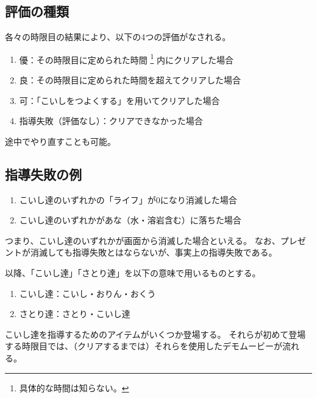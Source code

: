 \subsection{評価の種類}
各々の時限目の結果により、以下の4つの評価がなされる。
\begin{enumerate}[label={\sarrow}]
\item 優：その時限目に定められた時間%
\footnote{具体的な時間は知らない。}%
内にクリアした場合
\item 良：その時限目に定められた時間を超えてクリアした場合
\item 可：「こいしをつよくする」を用いてクリアした場合
\item 指導失敗（評価なし）：クリアできなかった場合
\end{enumerate}
途中でやり直すことも可能。


\subsection{指導失敗の例}
\begin{enumerate}[label={\sarrow}]
\item こいし達のいずれかの「ライフ」が0になり消滅した場合
\item こいし達のいずれかがあな（水・溶岩含む）に落ちた場合
\end{enumerate}
つまり、こいし達のいずれかが画面から消滅した場合といえる。
なお、プレゼントが消滅しても指導失敗とはならないが、事実上の指導失敗である。
\begin{marker}
以降、「こいし達」「さとり達」を以下の意味で用いるものとする。
\begin{enumerate}[label={\sarrow}]
\item こいし達：こいし・おりん・おくう
\item さとり達：さとり・こいし達
\end{enumerate}
\end{marker}


\clearpage
こいし達を指導するためのアイテムがいくつか登場する。
それらが初めて登場する時限目では、（クリアするまでは）それらを使用したデモムービーが流れる。

